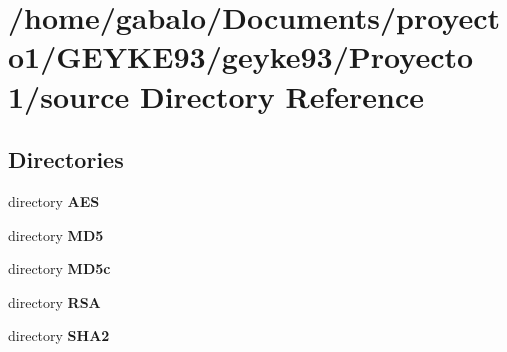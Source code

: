\section{/home/gabalo/\-Documents/proyecto1/\-G\-E\-Y\-K\-E93/geyke93/\-Proyecto 1/source Directory Reference}
\label{dir_b2f33c71d4aa5e7af42a1ca61ff5af1b}
\subsection*{Directories}
\begin{DoxyCompactItemize}
\item 
directory {\bf A\-E\-S}
\item 
directory {\bf M\-D5}
\item 
directory {\bf M\-D5c}
\item 
directory {\bf R\-S\-A}
\item 
directory {\bf S\-H\-A2}
\end{DoxyCompactItemize}
